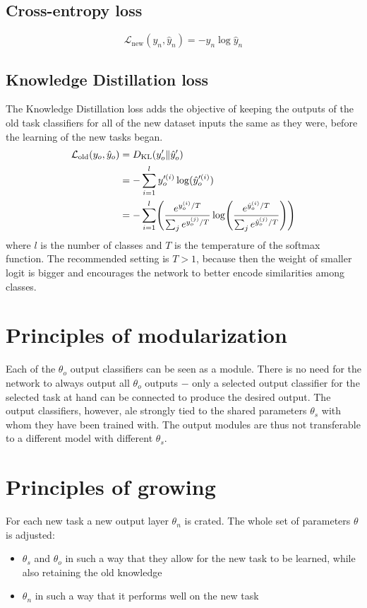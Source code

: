 \documentclass[a4paper,twocolumn]{article}
\let\originalleft\left
\let\originalright\right
\renewcommand{\left}{\mathopen{}\mathclose\bgroup\originalleft}
\renewcommand{\right}{\aftergroup\egroup\originalright}
\begin{document}
\subsection{Cross-entropy loss}
\label{ssec:CEloss}
\begin{equation*}
    \mathcal{L}_{\mathrm{new}}(y_n, \hat{y}_n) = -y_n \log\hat{y}_n
\end{equation*}

\subsection{Knowledge Distillation loss}
\label{ssec:KDloss}
The Knowledge Distillation loss adds the objective of keeping the outputs of the old task classifiers for all of the new dataset inputs the same as they were, before the learning of the new tasks began.
\begin{align*}
    \mathcal{L}_{\mathrm{old}}(y_o, \hat{y}_o) &= D_{\mathrm{KL}}(y_o^\prime\|\hat{y}_o^\prime) \\
                &= - \sum_{i=1}^l y_o^{\prime(i)} \log(\hat{y}_o^{\prime(i)}) \\
                &= - \sum_{i=1}^l \left( \frac{e^{y_o^{(i)}/T}}{\sum_j e^{y_o^{(j)}/T}} \log \left( \frac{e^{\hat{y}_o^{(i)}/T}}{\sum_j e^{\hat{y}_o^{(j)}/T}} \right) \right)
\end{align*}
where $l$ is the number of classes and $T$ is the temperature of the softmax function. The recommended setting is $T > 1$, because then the weight of smaller logit is bigger and encourages the network to better encode similarities among classes. %

\section{Principles of modularization}
Each of the $\theta_o$ output classifiers can be seen as a module. There is no need for the network to always output all $\theta_o$ outputs $-$ only a selected output classifier for the selected task at hand can be connected to produce the desired output. The output classifiers, however, ale strongly tied to the shared parameters $\theta_s$ with whom they have been trained with. The output modules are thus not transferable to a different model with different $\theta_s$.

\section{Principles of growing}
For each new task a new output layer $\theta_n$ is crated. The whole set of parameters $\theta$ is adjusted:
\begin{itemize}
    \item $\theta_s$ and $\theta_o$ in such a way that they allow for the new task to be learned, while also retaining the old knowledge
    \item $\theta_n$ in such a way that it performs well on the new task
\end{itemize}
\end{document}
